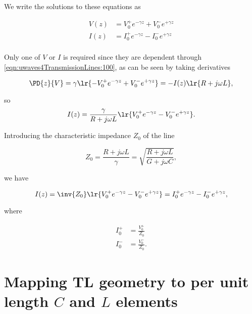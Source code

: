We write the solutions to these equations as

\begin{equation}\label{eqn:uwaves4TransmissionLines:200}
\begin{aligned}
V(z) &= V_0^{+} e^{-\gamma z} + V_0^{-} e^{+\gamma z} \\
I(z) &= I_0^{+} e^{-\gamma z} - I_0^{-} e^{+\gamma z} \\
\end{aligned}
\end{equation}

Only one of \( V \) or \( I \) is required since they are dependent through \cref{eqn:uwaves4TransmissionLines:100}, as can be seen by taking derivatives

\begin{dmath}\label{eqn:uwaves4TransmissionLines:220}
\PD{z}{V} 
= \gamma \lr{ -V_0^{+} e^{-\gamma z} + V_0^{-} e^{+\gamma z} }
= 
-I(z) \lr{ R + j \omega L },
\end{dmath}

so
\begin{equation}\label{eqn:uwaves4TransmissionLines:240}
I(z) 
=
\frac{\gamma}{ R + j \omega L } \lr{ V_0^{+} e^{-\gamma z} - V_0^{-} e^{+\gamma z} }.
\end{equation}

Introducing the characteristic impedance \( Z_0 \) of the line

\begin{dmath}\label{eqn:uwaves4TransmissionLines:260}
Z_0 
= \frac{R + j \omega L}{\gamma} 
= \sqrt{ \frac{R + j \omega L}{G + j \omega C} },
\end{dmath}

we have

\begin{dmath}\label{eqn:uwaves4TransmissionLines:280}
I(z) 
=
\inv{Z_0} \lr{ V_0^{+} e^{-\gamma z} - V_0^{-} e^{+\gamma z} }
=
I_0^{+} e^{-\gamma z} - I_0^{-} e^{+\gamma z},
\end{dmath}

where

\begin{equation}\label{eqn:uwaves4TransmissionLines:300}
\begin{aligned}
I_0^{+} &= \frac{V_0^{+}}{Z_0} \\
I_0^{-} &= \frac{V_0^{-}}{Z_0}.
\end{aligned}
\end{equation}

\section{Mapping TL geometry to per unit length \( C \) and \( L \) elements}

